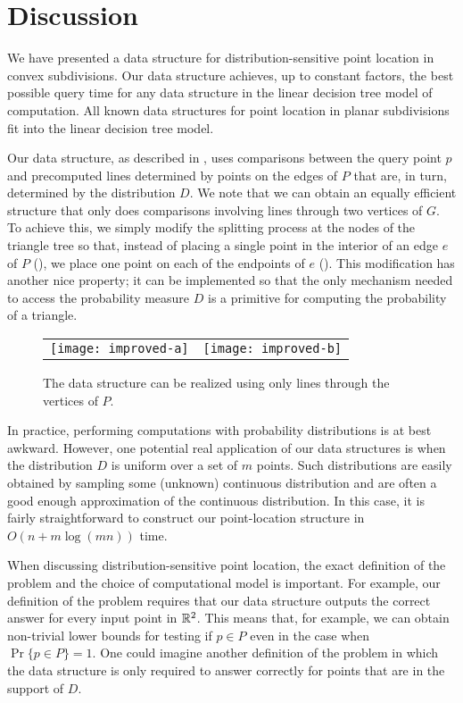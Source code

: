\documentclass[charterfonts,lotsofwhite]{patmorin}
\begin{document}
\section{Discussion}

We have presented a data structure for distribution-sensitive point
location in convex subdivisions.  Our data structure achieves, up to
constant factors, the best possible query time for any data structure
in the linear decision tree model of computation.  All known data
structures for point location in planar subdivisions fit into the
linear decision tree model. 

Our data structure, as described in , uses
comparisons between the query point $p$ and precomputed lines
determined by points on the edges of $P$ that are, in turn, determined
by the distribution $D$.  We note that we can obtain an equally
efficient structure that only does comparisons involving lines through
two vertices of $G$.  To achieve this, we simply modify the splitting
process at the nodes of the triangle tree so that, instead of placing
a single point in the interior of an edge $e$ of $P$ (),
we place one point on each of the endpoints of $e$
(). This modification has another nice
property; it can be implemented so that the only mechanism needed to
access the probability measure $D$ is a primitive for computing the
probability of a triangle.

\begin{figure}
\begin{center}\begin{tabular}{cc}
\texttt{[image: improved-a]} & \texttt{[image: improved-b]}
\end{tabular}
\end{center}
\caption{The data structure can be realized using only lines through
the vertices of $P$.}
\end{figure}

In practice, performing computations with probability distributions is
at best awkward.  However, one potential real application of our data
structures is when the distribution $D$ is uniform over a set of $m$
points.  Such distributions are easily obtained by sampling some
(unknown) continuous distribution and are often a good enough
approximation of the continuous distribution.  In this case, it is
fairly straightforward to construct our point-location structure in
$O(n+ m\log(mn))$ time.

When discussing distribution-sensitive point location, the exact
definition of the problem and the choice of computational model is
important.  For example, our definition of the problem requires that
our data structure outputs the correct answer for every input point in
$\mathbb{R}^2$.  This means that, for example, we can obtain non-trivial lower
bounds for testing if $p\in P$ even in the case when $\Pr\{p\in
P\}=1$. One could imagine another definition of the problem in which
the data structure is only required to answer correctly for points
that are in the support of $D$.
\end{document}
